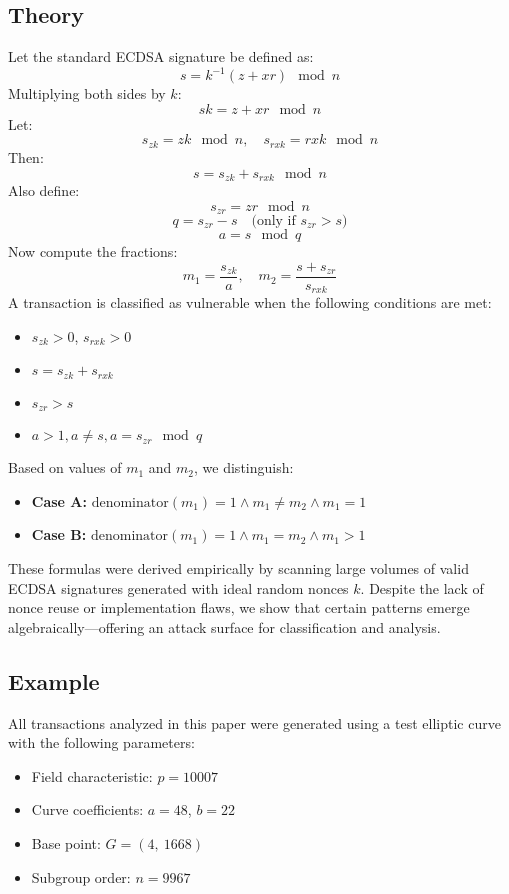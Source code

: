 \documentclass[11pt]{article}
\begin{document}
\subsection{Theory}
Let the standard ECDSA signature be defined as:
\[
s = k^{-1}(z + xr) \mod n
\]
Multiplying both sides by \( k \):
\[
sk = z + xr \mod n
\]
Let:
\[
s_{zk} = zk \mod n, \quad s_{rxk} = rxk \mod n
\]
Then:
\[
s = s_{zk} + s_{rxk} \mod n
\]
Also define:
\[
s_{zr} = zr \mod n
\]
\[
q = s_{zr} - s \quad \text{(only if } s_{zr} > s \text{)}
\]
\[
a = s \mod q
\]
Now compute the fractions:
\[
m_1 = \frac{s_{zk}}{a}, \quad m_2 = \frac{s + s_{zr}}{s_{rxk}}
\]
A transaction is classified as vulnerable when the following conditions are met:
\begin{itemize}
  \item \( s_{zk} > 0 \), \( s_{rxk} > 0 \)
  \item \( s = s_{zk} + s_{rxk} \)
  \item \( s_{zr} > s \)
  \item \( a > 1, a \neq s, a = s_{zr} \mod q \)
\end{itemize}
Based on values of \( m_1 \) and \( m_2 \), we distinguish:
\begin{itemize}
  \item \textbf{Case A:} \( \text{denominator}(m_1) = 1 \land m_1 \neq m_2 \land m_1 = 1 \)
  \item \textbf{Case B:} \( \text{denominator}(m_1) = 1 \land m_1 = m_2 \land m_1 > 1 \)
\end{itemize}
These formulas were derived empirically by scanning large volumes of valid ECDSA signatures generated with ideal random nonces \( k \). Despite the lack of nonce reuse or implementation flaws, we show that certain patterns emerge algebraically—offering an attack surface for classification and analysis.

\subsection{Example}
All transactions analyzed in this paper were generated using a test elliptic curve with the following parameters:

\begin{itemize}
  \item Field characteristic: $p = 10007$
  \item Curve coefficients: $a = 48$, $b = 22$
  \item Base point: $G = (4,\ 1668)$
  \item Subgroup order: $n = 9967$
\end{itemize}
\end{document}
